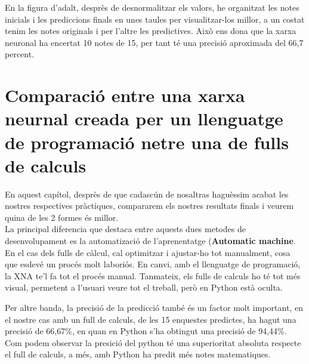 En la figura d'adalt, desprès de desnormalitzar els valors, he organitzat les notes inicials i les prediccions finals en unes taules per visualitzar-los millor, a un costat tenim les notes originals i per l'altre les predictives.
 Això ens dona que la xarxa neuronal ha encertat 10 notes de 15, per tant té una precisió aproximada del 66,7 percent.

\section{Comparació entre una xarxa neurnal creada per un llenguatge de programació netre una de fulls de calculs}
En aquest capítol, desprès de que cadascún de nosaltras haguèssim acabat les nostres respectives pràctiques, compararem els nostres resultats finals i veurem quina de les 2 formes és millor.\\

La principal diferencia que destaca entre aquests dues metodes de desenvolupament es la automatizació de l'aprenentatge (\textbf{Automatic machine}. En el cas dels fulls de càlcul, cal optimitzar i ajustar-ho tot manualment, cosa que esdevé un procés molt laboriós. En canvi, amb el llenguatge de programació, la XNA te'l fa tot el procés manual. Tanmateix, els fulls de calculs ho té tot més visual, permetent a l'usuari veure tot el treball, però en Python està oculta.\\

Per altre banda, la precisió de la predicció també és un factor molt important, en el nostre cas amb un full de calculs, de les 15 enquestes predictes, ha hagut una precisió de 66,67\%, en quan en Python s'ha obtingut una precisió de 94,44\%. Com podem observar la presició del python té una superioritat absoluta respecte el full de calculs, a més, amb Python ha predit més notes matematiques.\\

